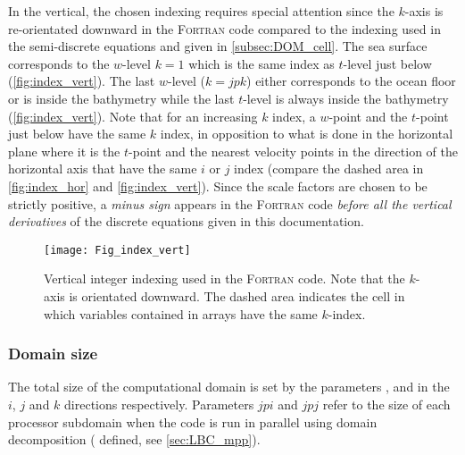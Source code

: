 \documentclass[../tex_main/NEMO_manual]{subfiles}
\begin{document}
In the vertical, the chosen indexing requires special attention since
the $k$-axis is re-orientated downward in the \textsc{Fortran} code compared to
the indexing used in the semi-discrete equations and given in \autoref{subsec:DOM_cell}.
The sea surface corresponds to the $w$-level $k=1$ which is the same index as $t$-level just below
(\autoref{fig:index_vert}).
The last $w$-level ($k=jpk$) either corresponds to the ocean floor or is inside the bathymetry while
the last $t$-level is always inside the bathymetry (\autoref{fig:index_vert}).
Note that for an increasing $k$ index, a $w$-point and the $t$-point just below have the same $k$ index,
in opposition to what is done in the horizontal plane where
it is the $t$-point and the nearest velocity points in the direction of the horizontal axis that
have the same $i$ or $j$ index
(compare the dashed area in \autoref{fig:index_hor} and \autoref{fig:index_vert}).
Since the scale factors are chosen to be strictly positive, a \emph{minus sign} appears in the \textsc{Fortran} 
code \emph{before all the vertical derivatives} of the discrete equations given in this documentation.

\begin{figure}[!pt]    \begin{center}
\texttt{[image: Fig\_index\_vert]}
\caption{ \protect\label{fig:index_vert}
  Vertical integer indexing used in the \textsc{Fortran } code.
  Note that the $k$-axis is orientated downward.
  The dashed area indicates the cell in which variables contained in arrays have the same $k$-index.}
\end{center}   \end{figure}

\subsubsection{Domain size}
\label{subsec:DOM_size}

The total size of the computational domain is set by the parameters ,
 and  in the $i$, $j$ and $k$ directions respectively.
Parameters $jpi$ and $jpj$ refer to the size of each processor subdomain when
the code is run in parallel using domain decomposition ( defined,
see \autoref{sec:LBC_mpp}).


$\ $\newline    %
\end{document}
